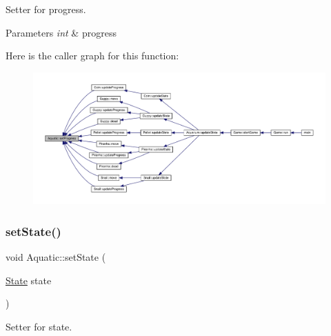 Setter for progress. 


\begin{DoxyParams}{Parameters}
{\em int} & progress \\
\hline
\end{DoxyParams}
Here is the caller graph for this function\+:\nopagebreak
\begin{figure}[H]
\begin{center}
\leavevmode
\includegraphics[width=350pt]{class_aquatic_a56bd74d0814dd9ed13b395c0033eb594_icgraph}
\end{center}
\end{figure}
\mbox{\label{class_aquatic_a33de0f838d9a6f504cd8efeaa112b4ea}} 
\subsubsection{\texorpdfstring{set\+State()}{setState()}}
{\footnotesize\ttfamily void Aquatic\+::set\+State (\begin{DoxyParamCaption}\item[{\mbox{\hyperlink{_constants_8hpp_a5d74787dedbc4e11c1ab15bf487e61f8}{State}}}]{state }\end{DoxyParamCaption})}



Setter for state. 


